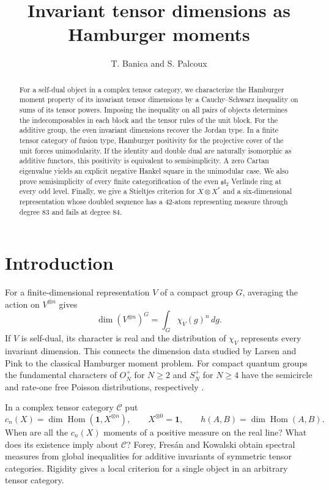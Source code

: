 \documentclass[11pt,reqno]{amsart}
\title[Invariant tensor moments]{Invariant tensor dimensions as Hamburger moments}
\author{T. Banica and S. Palcoux}
\date{}
\theoremstyle{definition}
\newcommand{\Hom}{\operatorname{Hom}}
\newcommand{\one}{\mathbf 1}
\newcommand{\C}{\mathcal C}
\begin{document}
\begin{abstract}
For a self-dual object in a complex tensor category, we characterize the Hamburger moment property of its invariant tensor dimensions by a Cauchy--Schwarz inequality on sums of its tensor powers. Imposing the inequality on all pairs of objects determines the indecomposables in each block and the tensor rules of the unit block. For the additive group, the even invariant dimensions recover the Jordan type. In a finite tensor category of fusion type, Hamburger positivity for the projective cover of the unit forces unimodularity. If the identity and double dual are naturally isomorphic as additive functors, this positivity is equivalent to semisimplicity. A zero Cartan eigenvalue yields an explicit negative Hankel square in the unimodular case. We also prove semisimplicity of every finite categorification of the even $\mathfrak{sl}_2$ Verlinde ring at every odd level. Finally, we give a Stieltjes criterion for $X\otimes X^*$ and a six-dimensional representation whose doubled sequence has a 42-atom representing measure through degree 83 and fails at degree 84.

\end{abstract}
\maketitle
\tableofcontents
\section*{Introduction}

For a finite-dimensional representation $V$ of a compact group $G$, averaging the action on $V^{\otimes n}$ gives
\[
       \dim(V^{\otimes n})^G=\int_G\chi_V(g)^n\,dg .
\]
If $V$ is self-dual, its character is real and the distribution of $\chi_V$ represents every invariant dimension. This connects the dimension data studied by Larsen and Pink \cite{LP} to the classical Hamburger moment problem. For compact quantum groups the fundamental characters of $O_N^+$ for $N\ge2$ and $S_N^+$ for $N\ge4$ have the semicircle and rate-one free Poisson distributions, respectively \cite{Banica,BCS}.

In a complex tensor category $\C$ put
\[
 c_n(X)=\dim\Hom(\one,X^{\otimes n}),\qquad X^{\otimes0}=\one,\qquad
 h(A,B)=\dim\Hom(A,B).
\]
When are all the $c_n(X)$ moments of a positive measure on the real line? What does its existence imply about $\C$? Forey, Fres\'an and Kowalski \cite[Propositions~2.1, 2.2 and~2.5]{FFK} obtain spectral measures from global inequalities for additive invariants of symmetric tensor categories. Rigidity gives a local criterion for a single object in an arbitrary tensor category.
\end{document}
